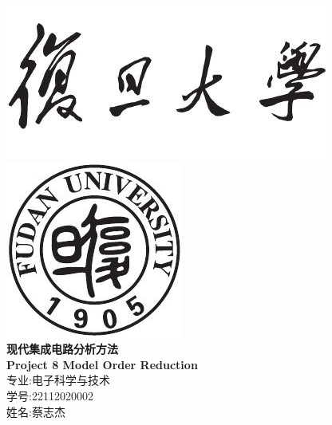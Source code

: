 \documentclass[12pt]{article}
\newcommand{\hmwkTitle}{Project 8 Model Order Reduction}
\newcommand{\hmwkAuthorName}{姓名:蔡志杰 }
\newcommand{\hmwMajor}{专业:电子科学与技术}
\newcommand{\hmwNumber}{学号:22112020002}
\begin{document}
\begin{sloppypar}
\begin{titlepage}
\begin{center}


\includegraphics[scale = 0.9]{fudan.jpg}\\
\includegraphics[scale = 0.6]{fudan_logo.jpg}\\
\vspace{0.5in}
\linespread{1.9}\huge {\bfseries 现代集成电路分析方法}\\
\linespread{1.9}\LARGE {\bfseries \textbf{\hmwkTitle}}\\
\vspace{1.0in}
\large \hmwMajor{}\\
\large \hmwNumber{}\\
\large \hmwkAuthorName{}\\

\end{center}
\end{titlepage}



\newpage
\begin{spacing}{1.2}
	\tableofcontents
\end{spacing}   %
\thispagestyle{empty}   %
\newpage


\end{sloppypar}
\end{document}
